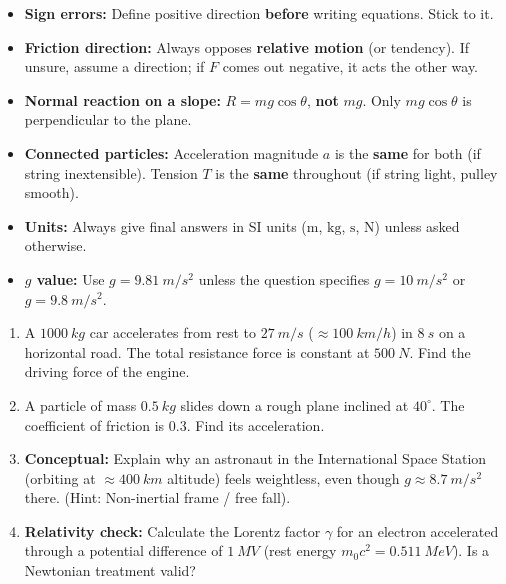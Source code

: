 \documentclass[11pt]{article}
\begin{document}
\begin{attention}
\begin{itemize}
    \item \textbf{Sign errors:} Define positive direction \textbf{before} writing equations. Stick to it.
    \item \textbf{Friction direction:} Always opposes \textbf{relative motion} (or tendency). If unsure, assume a direction; if $F$ comes out negative, it acts the other way.
    \item \textbf{Normal reaction on a slope:} $R = mg\cos\theta$, \textbf{not} $mg$. Only $mg\cos\theta$ is perpendicular to the plane.
    \item \textbf{Connected particles:} Acceleration magnitude $a$ is the \textbf{same} for both (if string inextensible). Tension $T$ is the \textbf{same} throughout (if string light, pulley smooth).
    \item \textbf{Units:} Always give final answers in SI units ($\mathrm{m}$, $\mathrm{kg}$, $\mathrm{s}$, $\mathrm{N}$) unless asked otherwise.
    \item \textbf{$g$ value:} Use $g = \SI{9.81}{m/s^2}$ unless the question specifies $g = \SI{10}{m/s^2}$ or $g = \SI{9.8}{m/s^2}$.
\end{itemize}
\end{attention}

\begin{exercice}
\begin{enumerate}
    \item A $\SI{1000}{kg}$ car accelerates from rest to $\SI{27}{m/s}$ ($ \approx \SI{100}{km/h}$) in $\SI{8}{s}$ on a horizontal road. The total resistance force is constant at $\SI{500}{N}$. Find the driving force of the engine.
    \item A particle of mass $\SI{0.5}{kg}$ slides down a rough plane inclined at $40^\circ$. The coefficient of friction is $0.3$. Find its acceleration.
    \item \textbf{Conceptual:} Explain why an astronaut in the International Space Station (orbiting at $\approx \SI{400}{km}$ altitude) feels weightless, even though $g \approx \SI{8.7}{m/s^2}$ there. (Hint: Non-inertial frame / free fall).
    \item \textbf{Relativity check:} Calculate the Lorentz factor $\gamma$ for an electron accelerated through a potential difference of $\SI{1}{MV}$ (rest energy $m_0c^2 = \SI{0.511}{MeV}$). Is a Newtonian treatment valid?
\end{enumerate}
\end{exercice}
\end{document}
